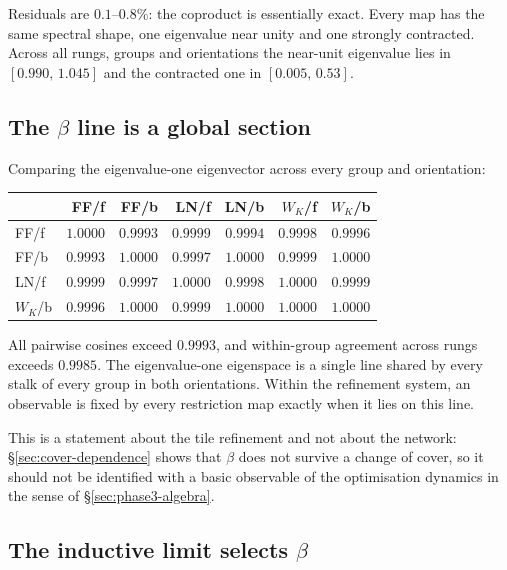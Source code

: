 Residuals are $0.1$--$0.8\%$: the coproduct is essentially exact. Every map has
the same spectral shape, one eigenvalue near unity and one strongly contracted.
Across all rungs, groups and orientations the near-unit eigenvalue lies in
$[0.990,\,1.045]$ and the contracted one in $[0.005,\,0.53]$.

\subsection{The \texorpdfstring{$\beta$}{beta} line is a global section}

Comparing the eigenvalue-one eigenvector across every group and orientation:

\begin{center}
\begin{tabular}{lrrrrrr}
\toprule
 & FF/f & FF/b & LN/f & LN/b & $W_K$/f & $W_K$/b \\
\midrule
FF/f    & $1.0000$ & $0.9993$ & $0.9999$ & $0.9994$ & $0.9998$ & $0.9996$ \\
FF/b    & $0.9993$ & $1.0000$ & $0.9997$ & $1.0000$ & $0.9999$ & $1.0000$ \\
LN/f    & $0.9999$ & $0.9997$ & $1.0000$ & $0.9998$ & $1.0000$ & $0.9999$ \\
$W_K$/b & $0.9996$ & $1.0000$ & $0.9999$ & $1.0000$ & $1.0000$ & $1.0000$ \\
\bottomrule
\end{tabular}
\end{center}

\begin{proposition}
All pairwise cosines exceed $0.9993$, and within-group agreement across rungs
exceeds $0.9985$. The eigenvalue-one eigenspace is a single line shared by
every stalk of every group in both orientations. Within the refinement system,
an observable is fixed by every restriction map exactly when it lies on this
line.
\end{proposition}

This is a statement about the tile refinement and not about the network:
\S\ref{sec:cover-dependence} shows that $\beta$ does not survive a change of
cover, so it should not be identified with a basic observable of the
optimisation dynamics in the sense of \S\ref{sec:phase3-algebra}.

\subsection{The inductive limit selects \texorpdfstring{$\beta$}{beta}}

